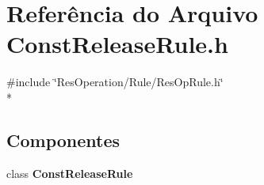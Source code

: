 \section{Referência do Arquivo Const\+Release\+Rule.\+h}
\label{_rule_2_const_release_2_const_release_rule_8h}
{\ttfamily \#include \char`\"{}Res\+Operation/\+Rule/\+Res\+Op\+Rule.\+h\char`\"{}}\\*
\subsection*{Componentes}
\begin{DoxyCompactItemize}
\item 
class {\bf Const\+Release\+Rule}
\end{DoxyCompactItemize}
